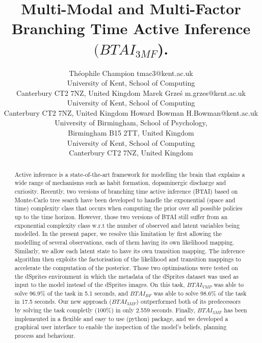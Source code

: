 \documentclass[twoside,11pt]{article}
\begin{document}
\title{Multi-Modal and Multi-Factor Branching Time Active Inference $(BTAI_{3MF}$).}

\author{\name Théophile Champion \email tmac3@kent.ac.uk \\
       \addr University of Kent, School of Computing\\
       Canterbury CT2 7NZ, United Kingdom
       \AND
       \name Marek Grze\'s \email m.grzes@kent.ac.uk \\
       \addr University of Kent, School of Computing\\
       Canterbury CT2 7NZ, United Kingdom
       \AND
       \name Howard Bowman \email H.Bowman@kent.ac.uk \\
       \addr University of Birmingham, School of Psychology,\\
       Birmingham B15 2TT, United Kingdom\\
       University of Kent, School of Computing\\
       Canterbury CT2 7NZ, United Kingdom
       }


\maketitle

\begin{abstract}%
Active inference is a state-of-the-art framework for modelling the brain that explains a wide range of mechanisms such as habit formation, dopaminergic discharge and curiosity. Recently, two versions of branching time active inference (BTAI) based on Monte-Carlo tree search have been developed to handle the exponential (space and time) complexity class that occurs when computing the prior over all possible policies up to the time horizon. However, those two versions of BTAI still suffer from an exponential complexity class w.r.t the number of observed and latent variables being modelled. In the present paper, we resolve this limitation by first allowing the modelling of several observations, each of them having its own likelihood mapping. Similarly, we allow each latent state to have its own transition mapping. The inference algorithm then exploits the factorisation of the likelihood and transition mappings to accelerate the computation of the posterior. Those two optimisations were tested on the dSprites environment in which the metadata of the dSprites dataset was used as input to the model instead of the dSprites images. On this task, $BTAI_{VMP}$ \citep{AITS_THEORY, AITS_PRACTICE} was able to solve 96.9\% of the task in 5.1 seconds, and $BTAI_{BF}$ \citep{BTAI_BF} was able to solve 98.6\% of the task in 17.5 seconds. Our new approach ($BTAI_{3MF}$) outperformed both of its predecessors by solving the task completly (100\%) in only 2.559 seconds. Finally, $BTAI_{3MF}$ has been implemented in a flexible and easy to use (python) package, and we developed a graphical user interface to enable the inspection of the model's beliefs, planning process and behaviour.
\end{abstract}
\end{document}
